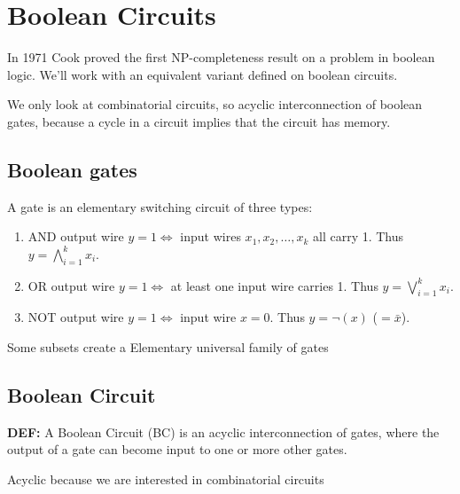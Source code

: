 \section{Boolean Circuits}
In 1971 Cook proved the first NP-completeness result on a problem in boolean logic. We'll work with an equivalent variant defined on boolean circuits.

We only look at combinatorial circuits, so acyclic interconnection of boolean gates, because a cycle in a circuit implies that the circuit has memory. 

\subsection{Boolean gates} A gate is an elementary switching circuit of three types:
\begin{enumerate}
\item AND
output wire $y=1\Longleftrightarrow$ input wires $x_1,x_2,\ldots,x_k$ all carry 1. Thus $y=\bigwedge_{i=1}^k x_i$.
\item OR
output wire $y=1\Longleftrightarrow$ at least one input wire carries 1. Thus $y=\bigvee_{i=1}^k x_i$.
\item NOT
output wire $y=1\Longleftrightarrow$ input wire $x=0$. Thus $y=\neg(x)$ ($=\bar x$).
\end{enumerate}

Some subsets create a Elementary universal family of gates 

\subsection{Boolean Circuit}
\begin{notesdefinition}
\textbf{DEF:} A Boolean Circuit (BC) is an acyclic interconnection of gates, where the output of a gate can become input to one or more other gates.

Acyclic because we are interested in combinatorial circuits
\end{notesdefinition}
